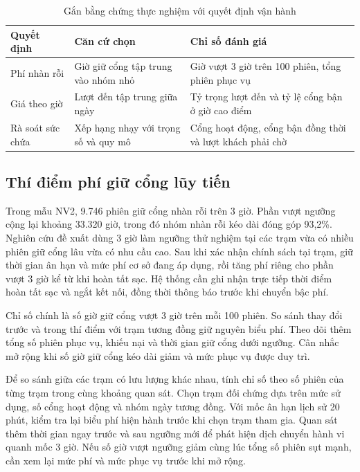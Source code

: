 \documentclass[conference,a4paper]{IEEEtran}
\begin{document}
\begin{table}[!t]
\caption{Gắn bằng chứng thực nghiệm với quyết định vận hành}
\label{tab:decisions}
\centering\footnotesize
\setlength{\tabcolsep}{3pt}
\begin{tabularx}{\columnwidth}{@{}p{}XX@{}}
\toprule
\textbf{Quyết định} & \textbf{Căn cứ chọn} & \textbf{Chỉ số đánh giá} \\
\midrule
Phí nhàn rỗi & Giờ giữ cổng tập trung vào nhóm nhỏ & Giờ vượt 3 giờ trên 100 phiên, tổng phiên phục vụ \\
Giá theo giờ & Lượt đến tập trung giữa ngày & Tỷ trọng lượt đến và tỷ lệ cổng bận ở giờ cao điểm \\
Rà soát sức chứa & Xếp hạng nhạy với trọng số và quy mô & Cổng hoạt động, cổng bận đồng thời và lượt khách phải chờ \\
\bottomrule
\end{tabularx}
\end{table}

\subsection{Thí điểm phí giữ cổng lũy tiến}
Trong mẫu NV2, 9.746 phiên giữ cổng nhàn rỗi trên 3 giờ. Phần vượt ngưỡng cộng lại khoảng 33.320 giờ, trong đó nhóm nhàn rỗi kéo dài đóng góp 93,2\%. Nghiên cứu đề xuất dùng 3 giờ làm ngưỡng thử nghiệm tại các trạm vừa có nhiều phiên giữ cổng lâu vừa có nhu cầu cao. Sau khi xác nhận chính sách tại trạm, giữ thời gian ân hạn và mức phí cơ sở đang áp dụng, rồi tăng phí riêng cho phần vượt 3 giờ kể từ khi hoàn tất sạc. Hệ thống cần ghi nhận trực tiếp thời điểm hoàn tất sạc và ngắt kết nối, đồng thời thông báo trước khi chuyển bậc phí.

Chỉ số chính là số giờ giữ cổng vượt 3 giờ trên mỗi 100 phiên. So sánh thay đổi trước và trong thí điểm với trạm tương đồng giữ nguyên biểu phí. Theo dõi thêm tổng số phiên phục vụ, khiếu nại và thời gian giữ cổng dưới ngưỡng. Cân nhắc mở rộng khi số giờ giữ cổng kéo dài giảm và mức phục vụ được duy trì.

Để so sánh giữa các trạm có lưu lượng khác nhau, tính chỉ số theo số phiên của từng trạm trong cùng khoảng quan sát. Chọn trạm đối chứng dựa trên mức sử dụng, số cổng hoạt động và nhóm ngày tương đồng. Với mốc ân hạn lịch sử 20 phút, kiểm tra lại biểu phí hiện hành trước khi chọn trạm tham gia. Quan sát thêm thời gian ngay trước và sau ngưỡng mới để phát hiện dịch chuyển hành vi quanh mốc 3 giờ. Nếu số giờ vượt ngưỡng giảm cùng lúc tổng số phiên sụt mạnh, cần xem lại mức phí và mức phục vụ trước khi mở rộng.
\end{document}
